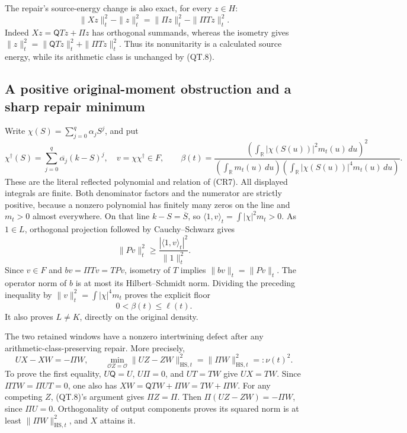 The repair's source-energy change is also exact, for every \(z\in H\):
\[
 \|Xz\|_t^2-\|z\|_t^2
       =\|\Pi z\|_t^2-\|\Pi Tz\|_t^2.
 \tag{QT.14}\label{eq:qt-energy}
\]
Indeed \(Xz=\mathsf QTz+\Pi z\) has orthogonal summands, whereas
the isometry gives
\(\|z\|_t^2=\|\mathsf QTz\|_t^2+\|\Pi Tz\|_t^2\).
Thus its nonunitarity is a calculated source energy, while its
arithmetic class is unchanged by (QT.8).

\subsection{A positive original-moment obstruction and a sharp repair minimum}

Write \(\chi(S)=\sum_{j=0}^q\alpha_jS^j\), and put
\[
 \chi^\dagger(S)=\sum_{j=0}^q\overline{\alpha_j}(k-S)^j,\quad
 v=\chi\chi^\dagger\in F,\qquad
 \beta(t)=
 \frac{\left(\int_{\mathbb R}|\chi(S(u))|^2m_t(u)\,du\right)^2}
 {\left(\int_{\mathbb R}m_t(u)\,du\right)
  \left(\int_{\mathbb R}|\chi(S(u))|^4m_t(u)\,du\right)}.
 \tag{QT.15}\label{eq:qt-momentfloor}
\]
These are the literal reflected polynomial and relation of (CR7).
All displayed integrals are finite. Both denominator factors and
the numerator are strictly positive, because a nonzero polynomial
has finitely many zeros on the line and \(m_t>0\) almost everywhere.
On that line \(k-S=\overline S\), so
\(\langle1,v\rangle_t=\int|\chi|^2m_t>0\).
As \(1\in L\), orthogonal projection followed by Cauchy--Schwarz gives
\[
 \|Pv\|_t^2\ge
       \frac{|\langle1,v\rangle_t|^2}{\|1\|_t^2}.
 \]
Since \(v\in F\) and \(bv=\Pi Tv=TPv\), isometry of \(T\) implies
\(\|bv\|_t=\|Pv\|_t\).
The operator norm of \(b\) is at most its Hilbert--Schmidt norm.
Dividing the preceding inequality by
\(\|v\|_t^2=\int|\chi|^4m_t\) proves the explicit floor
\[
 0<\beta(t)\le\ell(t).
 \tag{QT.16}\label{eq:qt-positive}
\]
It also proves \(L\ne K\), directly on the original density.

The two retained windows have a nonzero intertwining defect after
any arithmetic-class-preserving repair. More precisely,
\[
 UX-XW=-\Pi W,\qquad
 \min_{\mathcal OZ=\mathcal O}\|UZ-ZW\|_{\mathrm{HS},t}^2
       =\|\Pi W\|_{\mathrm{HS},t}^2
       =:\nu(t)^2.
 \tag{QT.17}\label{eq:qt-minimum}
\]
To prove the first equality, \(U\mathsf Q=U\), \(U\Pi=0\), and
\(UT=TW\) give \(UX=TW\).
Since \(\Pi TW=\Pi UT=0\), one also has
\(XW=\mathsf QTW+\Pi W=TW+\Pi W\).
For any competing \(Z\), (QT.8)'s argument gives \(\Pi Z=\Pi\).
Then
\(\Pi(UZ-ZW)=-\Pi W\), since \(\Pi U=0\).
Orthogonality of output components proves its squared norm is at
least \(\|\Pi W\|_{\mathrm{HS},t}^2\), and \(X\) attains it.

